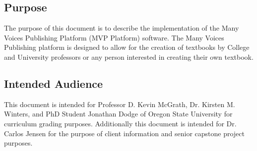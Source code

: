 \documentclass[letterpaper, 10pt, draftclsnofoot, compsoc, onecolumn]{IEEEtran}
\begin{document}
\subsection{Purpose}
{\noindent The purpose of this document is to describe the implementation 
of the Many Voices Publishing Platform (MVP Platform) software. 
The Many Voices Publishing platform is designed to allow for the creation 
of textbooks by College and University professors or any person interested 
in creating their own textbook.\par}

\subsection{Intended Audience}
{\noindent This document is intended for Professor D. Kevin McGrath, 
Dr. Kirsten M. Winters, and PhD Student Jonathan Dodge of Oregon State 
University for curriculum grading purposes. 
Additionally this document is intended for Dr. Carlos Jensen for the 
purpose of client information and senior capstone project purposes.\par}

\end{document}
